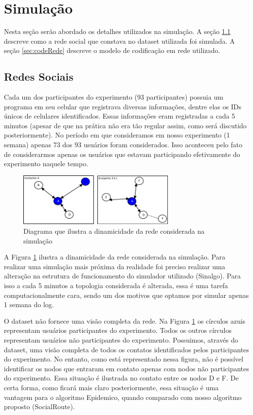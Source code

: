 \section{Simulação}
\label{simulacao}

Nesta seção serão abordado os detalhes utilizados na simulação. A seção
\ref{sec:redesSociais} 
descreve como a rede social que constava no dataset utilizada foi
simulada. A seção \ref{sec:codeRede} descreve o modelo de codificação em
rede utilizado.

\subsection{Redes Sociais} \label{sec:redesSociais}

Cada um dos participantes do experimento (93 participantes) possuia um
programa em seu celular que registrava diversas informações, dentre elas
os IDs únicos de celulares identificados. Essas informações eram
registradas a cada 5 minutos (apesar de que na prática não era tão
regular assim, como será discutido posteriormente). No período em que
consideramos em nosso experimento (1 semana) apenas 73 dos 93 usuários
foram considerados. Isso aconteceu pelo fato de considerarmos apenas os
usuários que estavam participando efetivamente do experimento naquele
tempo.

\begin{figure}[ht]
\centering
\includegraphics[width=0.7\textwidth]{img/diagramas/redeSocial.png}
\caption{Diagrama que ilustra a dinamicidade da rede considerada na
simulação}
\label{fig:diagramaRedeSocial}
\end{figure}


A Figura \ref{fig:diagramaRedeSocial} ilustra a dinamicidade da rede
considerada na simulação. Para realizar uma simulação mais próxima da
realidade foi preciso realizar uma alteração na estrutura de
funcionamento do simulador utilizado (Sinalgo). Para isso a cada 5
minutos a topologia considerada é alterada, essa é uma tarefa
computacionalmente cara, sendo um dos motivos que optamos por simular
apenas 1 semana do log. 

O dataset não fornece uma visão completa da rede. Na Figura
\ref{fig:diagramaRedeSocial} os círculos azuis representam usuários
participantes do experimento. Todos os outros círculos representam
usuários não participantes do experimento. Possuimos, através do
dataset, uma visão completa de todos os contatos identificados pelos
participantes do experimento. No entanto, como está representado nessa
figura, não é possível identificar os nodos que entraram em contato
apenas com nodos não participantes do experimento. Essa situação é
ilustrada no contato entre os nodos D e F. De certa forma, como ficará
mais claro posteriormente, essa situação é uma vantagem para o algoritmo
Epidemico, quando comparado com nosso algoritmo proposto (SocialRoute).


